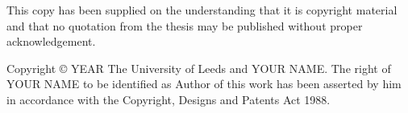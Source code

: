 
\vspace{\fill}

\noindent This copy has been supplied on the understanding that it is copyright material and that no quotation from the thesis may be published without proper acknowledgement.

\noindent Copyright \copyright\; YEAR The University of Leeds and YOUR NAME.
The right of YOUR NAME to be identified as Author of this work has been asserted by him in accordance with the Copyright, Designs and Patents Act 1988.
\cleardoublepage